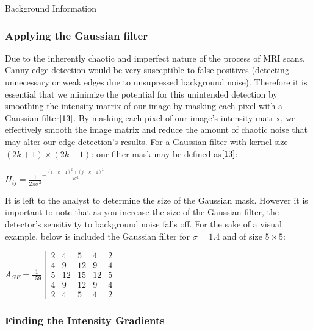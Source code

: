 \documentclass[a4paper,12pt]{article}
\begin{document}
\begin{section}{Background Information}
\subsubsection{Applying the Gaussian filter}

Due to the inherently chaotic and imperfect nature of the process of MRI scans, Canny edge detection would be very susceptible to false positives (detecting unnecessary or weak edges due to unsupressed background noise). Therefore it is essential that we minimize the potential for this unintended detection by smoothing the intensity matrix of our image by masking each pixel with a Gaussian filter$\cite{13}$.%
By masking each pixel of our image's intensity matrix, we effectively smooth the image matrix and reduce the amount of chaotic noise that may alter our edge detection's results. For a Gaussian filter with kernel size $(2k+1)\times(2k+1)$: our filter mask may be defined as$\cite{13}$:\\%
\begin{center}
$H_{ij} = \frac{1}{2\pi\sigma^{2}}^{-\frac{(i-k-1)^2+(j-k-1)^2}{2\sigma^2}}$
\end{center}

It is left to the analyst to determine the size of the Gaussian mask.
However it is important to note that as you increase the size of the Gaussian filter, the detector's sensitivity to background noise falls off.
For the sake of a visual example, below is included the Gaussian filter for $\sigma = 1.4$ and of size $5\times5$:\\

\singlespacing
\begin{center}
$A_{GF} = \frac{1}{159}\begin{bmatrix}
	2	&	4	&	5	&	4	&	2\\
	4	&	9	&	{12}	&	9	&	4\\
	5	&	{12}	&	{15}	&	{12}	&	5\\
	4       &       9       &       {12}    &       9       &       4\\
	2       &       4       &       5       &       4       &       2
\end{bmatrix}$
\end{center}
\doublespacing

\subsubsection{Finding the Intensity Gradients}


\end{section}
\end{document}
